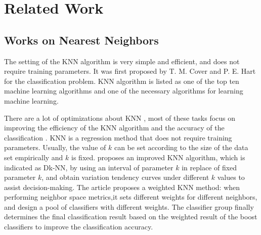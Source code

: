 \documentclass{ieeeaccess}
\begin{document}
\section{Related Work}
\subsection{Works on Nearest Neighbors}
The setting of the KNN algorithm is very simple and efficient, and does not require training parameters. It was first proposed by T. M. Cover and P. E. Hart for the classification problem\cite{cover1967nearest}. KNN algorithm is listed as one of the top ten machine learning algorithms and one of the necessary algorithms for learning machine learning.

There are a lot of optimizations about KNN \cite{cover1967nearest}, most of these tasks focus on improving the efficiency of the KNN algorithm and the accuracy of the classification \cite{chaudhuri2014rates}. KNN is a regression method that does not require training parameters. Usually, the value of $k$ can be set according to the size of the data set empirically and $k$ is fixed. \cite{Zhong:2017:IKC:3055635.3056604} proposes an improved KNN algorithm, which is indicated as Dk-NN, by using an interval of parameter $k$ in replace of fixed parameter $k$, and obtain variation tendency curves under different $k$ values to assist decision-making.
The article \cite{bicego2016weighted} proposes a weighted KNN method: when performing neighbor space metrics,it sets different weights for different neighbors, and design a pool of classifiers with different weights. The classifier group finally determines the final classification result based on the weighted result of the boost classifiers to improve the classification accuracy.
\end{document}
